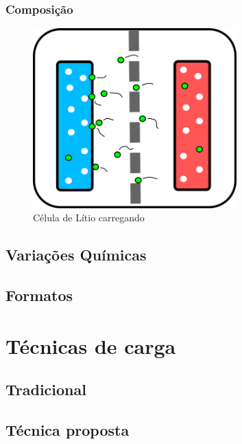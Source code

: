 \documentclass{beamer}
\begin{document}
\begin{frame}\frametitle{Composição}
	
\begin{figure}[h]
	\centering
	\includegraphics[width=0.70\textwidth]{battery-charging}
	\caption{Célula de Lítio carregando}
	\label{fig:battery-charging}
\end{figure}
\end{frame}				
	
	\subsection{Variações Químicas}
	\subsection{Formatos}
	
\section{Técnicas de carga}
	\subsection{Tradicional}
	\subsection{Técnica proposta}
\end{document}
